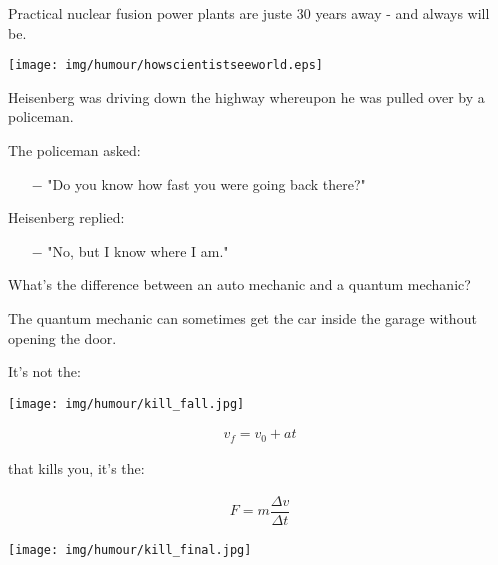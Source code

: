 Practical nuclear fusion power plants are juste 30 years away - and always will be.
	
	\pagebreak
	\begin{center}
	\texttt{[image: img/humour/howscientistseeworld.eps]}
	\end{center}
	
	\pagebreak
	
	Heisenberg was driving down the highway whereupon he was pulled over by a policeman. 

	The policeman asked:
	
	\begin{itemize}	 
		\item[$-$] "Do you know how fast you were going back there?"
	\end{itemize}
	
	Heisenberg replied: 
	
	\begin{itemize}	 
		\item[$-$] "No, but I know where I am."
	\end{itemize}
	\begin{center}\underline{\hspace{5 cm}}\end{center}
	
	What's the difference between an auto mechanic and a quantum mechanic?
	
	The quantum mechanic can sometimes get the car inside the garage without opening the door.
	
	\begin{center}\underline{\hspace{5 cm}}\end{center}
	
	\begin{center}
	It's not the:
	
	\texttt{[image: img/humour/kill\_fall.jpg]}
	\end{center}
	\begin{gather*}
		v_f=v_0+at
	\end{gather*}
	\begin{center}
	that kills you, it's the:
	\end{center}
	\begin{gather*}
		F=m\dfrac{\Delta v}{\Delta t}
	\end{gather*}
	\begin{center}
	\texttt{[image: img/humour/kill\_final.jpg]}
	\end{center}
	

